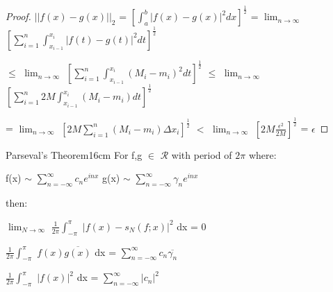 \begin{proof}
        \hspace{0.5cm}
        $||f(x)-g(x)||_2$
        = $[\int_a^b |f(x)-g(x)|^2 dx]^{\frac{1}{2}}$
        = $\lim_{n \rightarrow \infty}$
            $[\sum_{i=1}^n \int_{x_{i-1}}^{x_i} |f(t)-g(t)|^2 dt]^{\frac{1}{2}}$

        \hspace{0.5cm}
        $\leq$ $\lim_{n \rightarrow \infty}$
            $[\sum_{i=1}^n \int_{x_{i-1}}^{x_i} (M_i - m_i)^2 dt]^{\frac{1}{2}}$
        $\leq$ $\lim_{n \rightarrow \infty}$
            $[\sum_{i=1}^n 2M \int_{x_{i-1}}^{x_i} (M_i - m_i) dt]^{\frac{1}{2}}$

        \hspace{0.5cm}
        = $\lim_{n \rightarrow \infty}$
            $[2M \sum_{i=1}^n (M_i - m_i) \Delta x_i]^{\frac{1}{2}}$
        $<$ $\lim_{n \rightarrow \infty}$
            $[2M \frac{\epsilon^2}{2M}]^{\frac{1}{2}}$
        = $\epsilon$
    \end{proof}

    \newpage



    \begin{wtheorem}{Parseval's Theorem}{16cm}
        For f,g $\in$ $\mathscr{R}$ with period of $2\pi$ where:

        \hspace{0.5cm}
        f(x) $\sim$ $\sum_{n=-\infty}^{\infty} c_n e^{inx}$
        \hspace{1cm}
        g(x) $\sim$ $\sum_{n=-\infty}^{\infty} \gamma_n e^{inx}$
        
        then:

        \hspace{0.5cm}
        $\lim_{N \rightarrow \infty}$
        $\frac{1}{2\pi} \int_{-\pi}^{\pi}$
        $|f(x) - s_N(f;x)|^2$ dx = 0

        \vspace{0.1cm}

        \hspace{0.5cm}
        $\frac{1}{2\pi} \int_{-\pi}^{\pi}$
        $f(x) \overline{g(x)}$ dx
        = $\sum_{n=-\infty}^{\infty} c_n \overline{\gamma_n}$

        \vspace{0.1cm}

        \hspace{0.5cm}
        $\frac{1}{2\pi} \int_{-\pi}^{\pi}$
        $|f(x)|^2$ dx
        = $\sum_{n=-\infty}^{\infty} |c_n|^2$
    \end{wtheorem}

